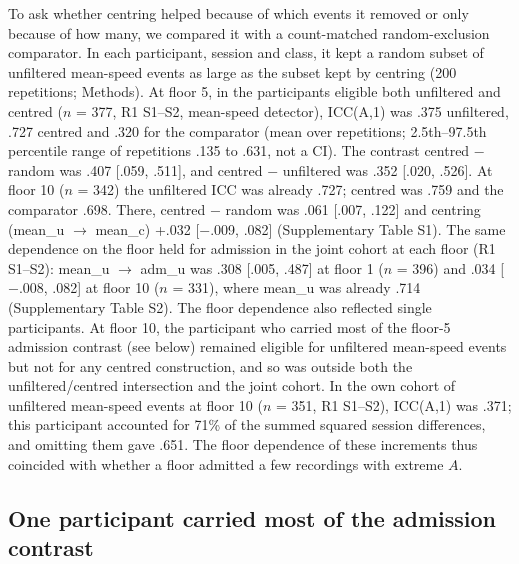 To ask whether centring helped because of which events it removed or only because of how many, we compared it with a count-matched random-exclusion comparator. In each participant, session and class, it kept a random subset of unfiltered mean-speed events as large as the subset kept by centring (200 repetitions; Methods). At floor 5, in the participants eligible both unfiltered and centred ($n$ = 377, R1 S1--S2, mean-speed detector), ICC(A,1) was .375 unfiltered, .727 centred and .320 for the comparator (mean over repetitions; 2.5th--97.5th percentile range of repetitions .135 to .631, not a CI). The contrast centred $-$ random was .407 [.059, .511], and centred $-$ unfiltered was .352 [.020, .526]. At floor 10 ($n$ = 342) the unfiltered ICC was already .727; centred was .759 and the comparator .698. There, centred $-$ random was .061 [.007, .122] and centring (mean\_u $\to$ mean\_c) +.032 [$-$.009, .082] (Supplementary Table S1). The same dependence on the floor held for admission in the joint cohort at each floor (R1 S1--S2): mean\_u $\to$ adm\_u was .308 [.005, .487] at floor 1 ($n$ = 396) and .034 [$-$.008, .082] at floor 10 ($n$ = 331), where mean\_u was already .714 (Supplementary Table S2). The floor dependence also reflected single participants. At floor 10, the participant who carried most of the floor-5 admission contrast (see below) remained eligible for unfiltered mean-speed events but not for any centred construction, and so was outside both the unfiltered/centred intersection and the joint cohort. In the own cohort of unfiltered mean-speed events at floor 10 ($n$ = 351, R1 S1--S2), ICC(A,1) was .371; this participant accounted for 71\% of the summed squared session differences, and omitting them gave .651. The floor dependence of these increments thus coincided with whether a floor admitted a few recordings with extreme $A$.

\subsection{One participant carried most of the admission contrast}

